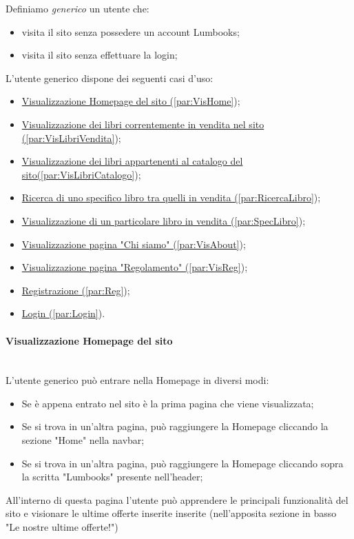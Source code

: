 Definiamo \textit{generico} un utente che:
\begin{itemize}
	\item visita il sito senza possedere un account Lumbooks;
	\item visita il sito senza effettuare la login;
\end{itemize}

L'utente generico dispone dei seguenti casi d'uso:
\begin{itemize}
	\item \hyperref[par:VisHome]{Visualizzazione Homepage del sito (\ref{par:VisHome}});
	\item \hyperref[par:VisLibriVendita]{Visualizzazione dei libri correntemente in vendita nel sito (\ref{par:VisLibriVendita}});
	\item \hyperref[par:VisLibriCatalogo]{Visualizzazione dei libri appartenenti al catalogo del sito(\ref{par:VisLibriCatalogo}});
	\item \hyperref[par:RicercaLibro]{Ricerca di uno specifico libro tra quelli in vendita (\ref{par:RicercaLibro}});
	\item \hyperref[par:SpecLibro]{Visualizzazione di un particolare libro in vendita (\ref{par:SpecLibro}});
	\item \hyperref[par:VisAbout]{Visualizzazione pagina "Chi siamo" (\ref{par:VisAbout}});	
	\item \hyperref[par:VisReg]{Visualizzazione pagina "Regolamento" (\ref{par:VisReg}});	
	\item \hyperref[par:Reg]{Registrazione (\ref{par:Reg}});
	\item \hyperref[par:Login]{Login (\ref{par:Login}}).
\end{itemize}


\paragraph{Visualizzazione Homepage del sito}\mbox{}\\
\label{par:VisHome}
L'utente generico può entrare nella Homepage in diversi modi:
\begin{itemize}
	\item Se è appena entrato nel sito è la prima pagina che viene visualizzata;
	\item Se si trova in un'altra pagina, può raggiungere la Homepage cliccando la sezione "Home" nella navbar;
	\item Se si trova in un'altra pagina, può raggiungere la Homepage cliccando sopra la scritta "Lumbooks" presente nell'header;
\end{itemize}
All'interno di questa pagina l'utente può apprendere le principali funzionalità del sito e visionare le ultime offerte inserite inserite (nell'apposita sezione in basso "Le nostre ultime offerte!")



